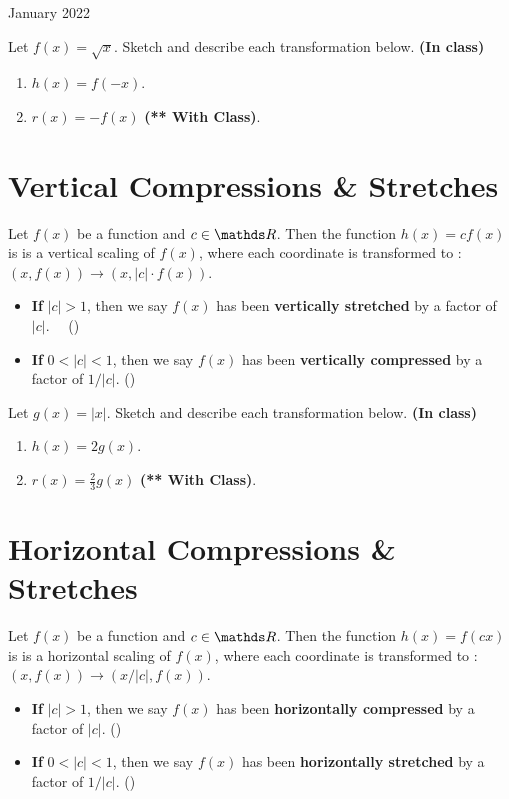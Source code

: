 \documentclass[12pt,oneside]{book} %
\begin{document}
\begin{lec}{January 2022}
  \begin{ex}
    Let $f(x) = \sqrt{x}$. Sketch and describe each transformation below. \textbf{(In class)}
    \begin{enumerate}[label=(\alph*)]
      \item $h(x) = f(-x)$.
      \item $r(x) = -f(x)$ \hfill \textbf{(** With Class)}.
    \end{enumerate}
  \end{ex}

  \section{Vertical Compressions \& Stretches}
  Let $f(x)$ be a function and $c \in \R$. Then the function $h(x) = cf(x)$ is is a vertical scaling of $f(x)$,
  where each coordinate is transformed to : $(x,f(x)) \rightarrow \left(x, \left|c\right|\cdot f(x)\right)$.
  \begin{itemize}
    \item \textbf{If } $\left|c\right| > 1$, then we say $f(x)$ has been \textbf{vertically stretched} by a factor
      of $\left|c\right|$. \,\,\,\,\,\,(\cite{col-alg})
    \item \textbf{If } $0 < \left|c\right| < 1$, then we say $f(x)$ has been \textbf{vertically compressed} by a factor
      of $1 / \left|c\right|$. \hspace*{14.7cm}(\cite{col-alg})
  \end{itemize}

  \begin{ex}
    Let $g(x) = \left|x\right|$. Sketch and describe each transformation below. \textbf{(In class)}
    \begin{enumerate}[label=(\alph*)]
      \item $h(x) = 2g(x)$.
      \item $r(x) = \frac{2}{3}g(x)$ \hfill \textbf{(** With Class)}.
    \end{enumerate}
  \end{ex}



  \section{Horizontal Compressions \& Stretches}
  Let $f(x)$ be a function and $c \in \R$. Then the function $h(x) = f(cx)$ is is a horizontal scaling of $f(x)$,
  where each coordinate is transformed to : $(x,f(x)) \rightarrow \left(x / \left|c\right| ,f(x)\right)$.
  \begin{itemize}
    \item \textbf{If } $\left|c\right| > 1$, then we say $f(x)$ has been \textbf{horizontally compressed} by a factor
      of $\left|c\right|$. \hspace*{14.7cm}(\cite{col-alg})
    \item \textbf{If } $0 < \left|c\right| < 1$, then we say $f(x)$ has been \textbf{horizontally stretched} by a factor
      of $1 / \left|c\right|$. \hspace*{14.7cm}(\cite{col-alg})
  \end{itemize}


\end{lec}
\end{document}
